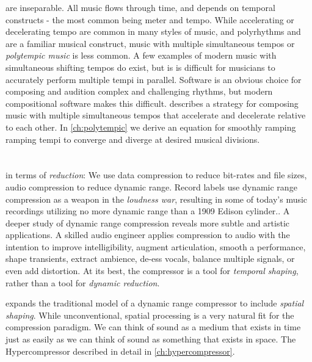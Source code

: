  are inseparable. All music flows through
time, and depends on temporal constructs - the most common being meter
and tempo. While accelerating or decelerating tempo are common in many
styles of music, and polyrhythms and are a familiar musical construct,
music with multiple simultaneous tempos or \textit{polytempic music}
is less common. A few examples of modern music with simultaneous
shifting tempos do exist, but is is difficult for musicians to
accurately perform multiple tempi in parallel. Software is an obvious
choice for composing and audition complex and challenging rhythms, but
modern compositional software makes this difficult. \polytempic
describes a strategy for composing music with multiple simultaneous
tempos that accelerate and decelerate relative to each other. In
\autoref{ch:polytempic} we derive an equation for smoothly ramping
ramping tempi to converge and diverge at desired musical divisions.

\section{\thesis}
\label{sec:hypercompression-intro}
  in terms of
\emph{reduction}: We use data compression to reduce bit-rates and file
sizes, audio compression to reduce dynamic range. Record labels use
dynamic range compression as a weapon in the \emph{loudness
  war}\cite{Deruty2014a}, resulting in some of today's music
recordings utilizing no more dynamic range than a 1909 Edison
cylinder.\cite{Katz2007}. A deeper study of dynamic range compression
reveals more subtle and artistic applications. A skilled audio
engineer applies compression to audio with the intention to improve
intelligibility, augment articulation, smooth a performance, shape
transients, extract ambience, de-ess vocals, balance multiple signals,
or even add distortion.\cite{Case2007} At its best, the compressor is
a tool for \emph{temporal shaping}, rather than a tool for
\emph{dynamic reduction}.

\thesis expands the traditional model of a dynamic range compressor to
include \emph{spatial shaping}. While unconventional, spatial
processing is a very natural fit for the compression paradigm. We can
think of sound as a medium that exists in time just as easily as we
can think of sound as something that exists in
space. The Hypercompressor described in detail in
\autoref{ch:hypercompressor}.

